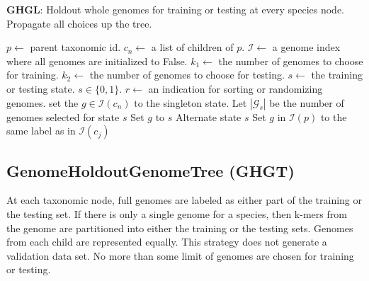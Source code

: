 \documentclass[12pt, letterpaper]{article}
\begin{document}
\begin{algorithm}[h!]
\caption{\textbf{GHGL}: Holdout whole genomes for training or testing at every species node.  Propagate all choices up the tree.}
\label{GHGL}
\begin{algorithmic}
\State $p \gets$ parent taxonomic id.
\State $c_n \gets$ a list of children of $p$.
\State $\mathcal{I} \gets$ a genome index where all genomes are initialized to False.
\State $k_1 \gets$ the number of genomes to choose for training.
\State $k_2 \gets$ the number of genomes to choose for testing.
\State $s \gets$ the training or testing state.  $s \in \{0, 1\}$.
\State $r \gets$ an indication for sorting or randomizing genomes.
 
set the $g \in \mathcal{I}(c_n)$ to the singleton state.
\Else
\State Let $|\mathcal{G}_s|$ be the number of genomes selected for state $s$
\State Set $g$ to $s$ 
\State Alternate state $s$
\EndIf
\EndFor
\EndIf
\Else {}
\State Set $g$ in $\mathcal{I}(p)$ to the same label as in $\mathcal{I}(c_j)$
\EndFor
\EndFor
\EndIf
\EndProcedure
\end{algorithmic}
\end{algorithm}

\newpage

\subsection{GenomeHoldoutGenomeTree (GHGT)}
At each taxonomic node, full genomes are labeled as either part of the training or the testing set.  If there is only a single genome for a species, then k-mers from the genome are partitioned into either the training or the testing sets.  Genomes from each child are represented equally.  This strategy does not generate a validation data set.  No more than some limit of genomes are chosen for training or testing.
\end{document}
